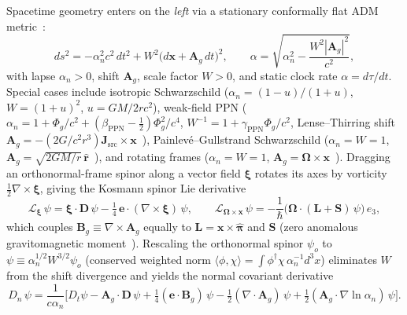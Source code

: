 \documentclass[aps,prd,onecolumn,tightenlines,nofootinbib,notitlepage,10pt,floatfix]{revtex4-2}
\theoremstyle{indentedtheorem}
\begin{document}
Spacetime geometry enters on the \emph{left} via a stationary conformally flat ADM metric~\citep{Arnowitt2008Dynamics,MTW1973Gravitation,Baumgarte2003Numerical}:
\begin{equation}
    ds^2 = -\alpha_n^2 c^2\,dt^2 + W^2\big(d\mathbf{x}+\mathbf{A}_g\,dt\big)^2 , \qquad \alpha = \sqrt{\alpha_n^2 - \frac{W^2|\mathbf{A}_g|^2}{c^2}} ,
    \label{eq:conformal_metric}
\end{equation}
with lapse $\alpha_n>0$, shift $\mathbf{A}_g$, scale factor $W>0$, and static clock rate $\alpha=d\tau/dt$. Special cases include isotropic Schwarzschild ($\alpha_n=(1-u)/(1+u)$, $W=(1+u)^2$, $u=GM/2rc^2$), weak-field PPN ($\alpha_n=1+\Phi_g/c^2+(\beta_\text{PPN}-\tfrac{1}{2})\Phi_g^2/c^4$, $W^{-1}=1+\gamma_\text{PPN}\Phi_g/c^2$, Lense--Thirring shift $\mathbf{A}_g=-(2G/c^2 r^3)\mathbf{J}_\text{src}\times\mathbf{x}$~\citep{Lense1918FrameDragging,Will2014Confrontation}), Painlev\'e--Gullstrand Schwarzschild ($\alpha_n=W=1$, $\mathbf{A}_g=\sqrt{2GM/r}\,\hat{\mathbf{r}}$~\citep{Painleve1921Mecanique,MartelPoisson2001Regular}), and rotating frames ($\alpha_n=W=1$, $\mathbf{A}_g=\boldsymbol{\Omega}\times\mathbf{x}$~\citep{HehlNi1990Inertial}). Dragging an orthonormal-frame spinor along a vector field $\boldsymbol{\xi}$ rotates its axes by vorticity $\tfrac{1}{2}\nabla\times\boldsymbol{\xi}$, giving the Kosmann spinor Lie derivative~\citep{Kosmann1971Derivees,ObukhovSilenkoTeryaev2011Dirac}
\begin{equation}
    \mathcal{L}_{\boldsymbol{\xi}}\,\psi = \boldsymbol{\xi}\cdot\mathbf{D}\,\psi - \tfrac{1}{4}\,\mathbf{e}\cdot(\nabla\times\boldsymbol{\xi})\,\psi , \qquad \mathcal{L}_{\boldsymbol{\Omega}\times\mathbf{x}}\,\psi = -\frac{1}{\hbar}\big(\boldsymbol{\Omega}\cdot(\mathbf{L}+\mathbf{S})\,\psi\big)\,e_3 ,
    \label{eq:spinor_lie}
\end{equation}
which couples $\mathbf{B}_g\equiv\nabla\times\mathbf{A}_g$ equally to $\mathbf{L}=\mathbf{x}\times\hat{\boldsymbol{\pi}}$ and $\mathbf{S}$ (zero anomalous gravitomagnetic moment~\citep{KobzarevOkun1963Gravitational}). Rescaling the orthonormal spinor $\psi_o$ to $\psi\equiv\alpha_n^{1/2}W^{3/2}\psi_o$ (conserved weighted norm $\langle\phi,\chi\rangle=\int\phi^\dagger\chi\,\alpha_n^{-1}d^3x$) eliminates $W$ from the shift divergence and yields the normal covariant derivative
\begin{equation}
    D_n\,\psi = \frac{1}{c\alpha_n}\big[D_t\psi - \mathbf{A}_g\cdot\mathbf{D}\,\psi + \tfrac{1}{4}(\mathbf{e}\cdot\mathbf{B}_g)\,\psi - \tfrac{1}{2}(\nabla\cdot\mathbf{A}_g)\,\psi + \tfrac{1}{2}(\mathbf{A}_g\cdot\nabla\ln\alpha_n)\,\psi\big] .
    \label{eq:normal_derivative}
\end{equation}
\end{document}
